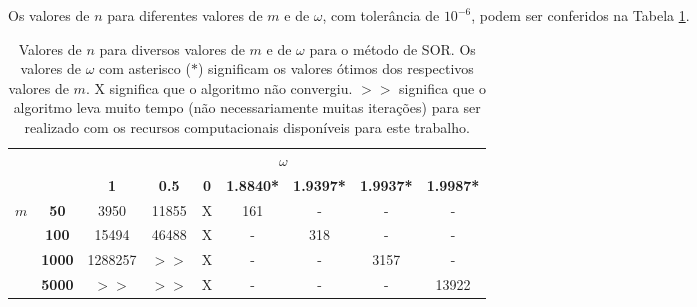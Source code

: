 \documentclass{article}
\begin{document}
\begin{enumerate}
\begin{enumerate}
                    Os valores de $n$ para diferentes valores de $m$ e de $\omega$, com tolerância de 
                    $10^{-6}$, podem ser conferidos na Tabela \ref{tab:omega_m}.

                    \begin{table}[!h]
                        \centering
                        \begin{tabular}{cc|c|c|c|c|c|c|c|}
                            \cline{3-9}
                                                &               & \multicolumn{7}{c|}{\textbf{$\omega$}}      \\ \cline{3-9} 
                            &
                            &
                            \textbf{1} &
                            \textbf{0.5} &
                            \textbf{0} &
                            \textbf{1.8840*} &
                            \textbf{1.9397*} &
                            \textbf{1.9937*} &
                            \textbf{1.9987*} \\ \hline
                            \multicolumn{1}{|c|}{\multirow{4}{*}{\textbf{$m$}}} &
                            \textbf{50} &
                            3950 &
                            11855 &
                            X &
                            161 &
                            - &
                            - &
                            - \\ \cline{2-9} 
                            \multicolumn{1}{|c|}{} & \textbf{100}  & 15494 & 46488 & X & - & 318 & -    & -     \\ \cline{2-9} 
                            \multicolumn{1}{|c|}{} & \textbf{1000} & 1288257 & $>>$ & X & - & -   & 3157 & -     \\ \cline{2-9} 
                            \multicolumn{1}{|c|}{} & \textbf{5000} & $>>$ & $>>$ & X & - & -   & -    & 13922 \\ \hline
                        \end{tabular}
                        \caption{Valores de $n$ para diversos valores de $m$ e de $\omega$ para o método de SOR. Os valores de $\omega$ com asterisco ($*$)
                        significam os valores ótimos dos respectivos valores de $m$. X significa que o algoritmo não convergiu. $>>$ significa que o algoritmo
                        leva muito tempo (não necessariamente muitas iterações) para ser realizado com os recursos computacionais disponíveis para este trabalho.}
                        \label{tab:omega_m}
                    \end{table}


\end{enumerate}
\end{enumerate}
\end{document}
